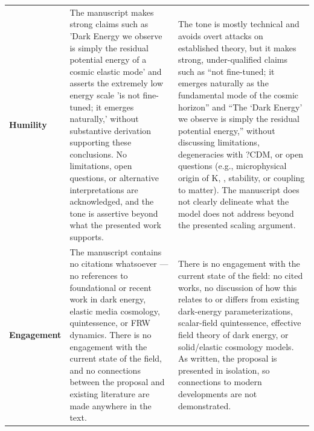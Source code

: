 \documentclass[11pt]{article}
\begin{document}
\begin{longtable}{@{} p{2.2cm} p{6.3cm} p{6.3cm} @{}}
\rowcolor{rowgray}
\textbf{Humility} &
The manuscript makes strong claims such as 'Dark Energy we observe is simply the residual potential energy of a cosmic elastic mode' and asserts the extremely low energy scale 'is not fine-tuned; it emerges naturally,' without substantive derivation supporting these conclusions. No limitations, open questions, or alternative interpretations are acknowledged, and the tone is assertive beyond what the presented work supports. &
The tone is mostly technical and avoids overt attacks on established theory, but it makes strong, under-qualified claims such as ``not fine-tuned; it emerges naturally as the fundamental mode of the cosmic horizon'' and ``The `Dark Energy' we observe is simply the residual potential energy,'' without discussing limitations, degeneracies with ?CDM, or open questions (e.g., microphysical origin of K, \textmu{}, stability, or coupling to matter). The manuscript does not clearly delineate what the model does not address beyond the presented scaling argument. \\[6pt]

\textbf{Engagement} &
The manuscript contains no citations whatsoever --- no references to foundational or recent work in dark energy, elastic media cosmology, quintessence, or FRW dynamics. There is no engagement with the current state of the field, and no connections between the proposal and existing literature are made anywhere in the text. &
There is no engagement with the current state of the field: no cited works, no discussion of how this relates to or differs from existing dark-energy parameterizations, scalar-field quintessence, effective field theory of dark energy, or solid/elastic cosmology models. As written, the proposal is presented in isolation, so connections to modern developments are not demonstrated. \\[6pt]


\end{longtable}
\end{document}
